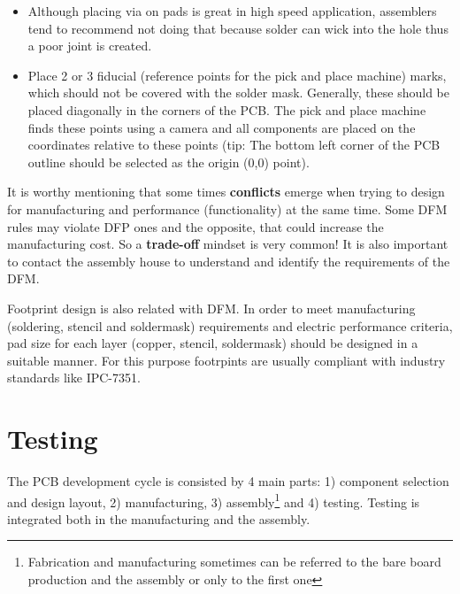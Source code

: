 \documentclass[final]{cubedoc}
\begin{document}
\begin{itemize}
		\item Although placing via on pads is great in high speed application, assemblers tend to recommend not doing that because solder can wick into the hole thus a poor joint is created.
		
		
		\item Place 2 or 3 fiducial (reference points for the pick and place machine) marks, which should not be covered with the solder mask. Generally, these should be placed diagonally in the corners of the PCB. The pick and place machine finds these points using a camera and all components are placed on the coordinates relative to these points (tip: The bottom left corner of the PCB outline should be selected as the origin (0,0) point). 
		
		
	\end{itemize}
	
	It is worthy mentioning that some times \textbf{conflicts} emerge when trying to design for manufacturing and performance (functionality) at the same time. Some DFM rules may violate DFP ones and the opposite, that could increase the manufacturing cost. So a \textbf{trade-off} mindset is very common! It is also important to contact the assembly house to understand and identify the requirements of the DFM.
	
	Footprint design is also related with DFM. In order to meet manufacturing (soldering, stencil and soldermask) requirements and electric performance criteria, pad size for each layer (copper, stencil, soldermask) should be designed in a suitable manner. For this purpose footrpints are usually compliant with industry standards like IPC-7351.
	
	\section{Testing}
	
	The PCB development cycle is consisted by 4 main parts: 1) component selection and design layout, 2) manufacturing, 3) assembly\footnote{Fabrication and manufacturing sometimes can be referred to the bare board production and the assembly or only to the first one} and 4) testing. Testing is integrated both in the manufacturing and the assembly.
	
\end{document}
